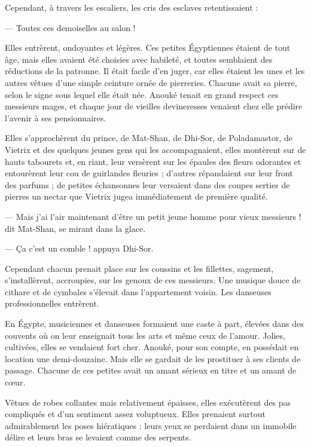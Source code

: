 \documentclass[a4paper, 11pt, oneside, polutonikogreek, french]{article}
\begin{document}
\bigskip
\centerline{\EightStarTaper}
\centerline{\EightStarTaper\EightStarTaper}
\bigskip

Cependant, à travers les escaliers, les cris des esclaves retentissaient :

--- Toutes ces demoiselles au salon !

Elles entrèrent, ondoyantes et légères. Ces petites Égyptiennes étaient de tout âge, mais elles avaient été choisies avec habileté, et toutes semblaient des réductions de la patronne. Il était facile d'en juger, car elles étaient les unes et les autres vêtues d'une simple ceinture ornée de pierreries. Chacune avait sa pierre, selon le signe sous lequel elle était née. Anouké tenait en grand respect ces messieurs mages, et chaque jour de vieilles devineresses venaient chez elle prédire l'avenir à ses pensionnaires.

Elles s'approchèrent du prince, de Mat-Shan, de Dhi-Sor, de Poladamastor, de Vietrix et des quelques jeunes gens qui les accompagnaient, elles montèrent sur de hauts tabourets et, en riant, leur versèrent sur les épaules des fleurs odorantes et entourèrent leur cou de guirlandes fleuries ; d'autres répandaient sur leur front des parfums ; de petites échansonnes leur versaient dans des coupes serties de pierres un nectar que Vietrix jugea immédiatement de première qualité.

--- Mais j'ai l'air maintenant d'être un petit jeune homme pour vieux messieurs ! dit Mat-Shan, se mirant dans la glace.

--- Ça c'est un comble ! appuya Dhi-Sor.

\bigskip
\centerline{\EightStarTaper}
\centerline{\EightStarTaper\EightStarTaper}
\bigskip

Cependant chacun prenait place sur les coussins et les fillettes, sagement, s'installèrent, accroupies, sur les genoux de ces messieurs. Une musique douce de cithare et de cymbales s'élevait dans l'appartement voisin. Les danseuses professionnelles entrèrent.

En Égypte, musiciennes et danseuses formaient une caste à part, élevées dans des couvents où on leur enseignait tous les arts et même ceux de l'amour. Jolies, cultivées, elles se vendaient fort cher. Anouké, pour son compte, en possédait en location une demi-douzaine. Mais elle se gardait de les prostituer à ses clients de passage. Chacune de ces petites avait un amant sérieux en titre et un amant de cœur.

Vêtues de robes collantes mais relativement épaisses, elles exécutèrent des pas compliqués et d'un sentiment assez voluptueux. Elles prenaient surtout admirablement les poses hiératiques : leurs yeux se perdaient dans un immobile délire et leurs bras se levaient comme des serpents.
\end{document}
